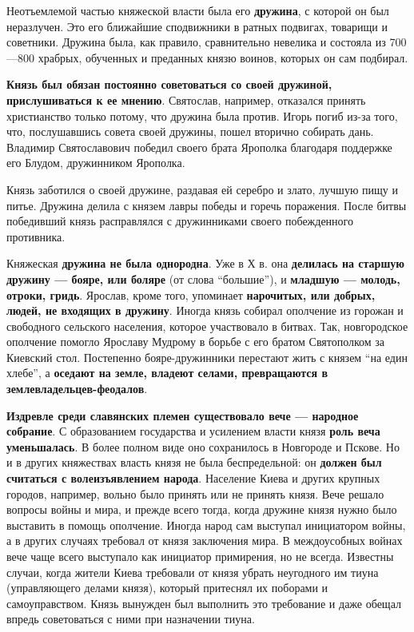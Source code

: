 \documentclass{article}
\begin{document}
\hfill

Неотъемлемой частью княжеской власти была его \textbf{дружина}, с которой он был неразлучен. Это его ближайшие сподвижники в ратных подвигах, товарищи и советники. Дружина была, как правило, сравнительно невелика и состояла из 700—800 храбрых, обученных и преданных князю воинов, которых он сам подбирал.

\textbf{Князь был обязан постоянно советоваться со своей дружиной, прислушиваться к ее мнению}. Святослав, например, отказался принять христианство только потому, что дружина была против. Игорь погиб из-за того, что, послушавшись совета своей дружины, пошел вторично собирать дань. Владимир Святославович победил своего брата Ярополка благодаря поддержке его Блудом, дружинником Ярополка.

Князь заботился о своей дружине, раздавая ей серебро и злато, лучшую пищу и питье. Дружина делила с князем лавры победы и горечь поражения. После битвы победивший князь расправлялся с дружинниками своего побежденного противника.

\hfill

Княжеская \textbf{дружина не была однородна}. Уже в Х в. она \textbf{делилась на старшую дружину — бояре, или боляре} (от слова “большие”), и \textbf{младшую — молодь, отроки, гридь}. Ярослав, кроме того, упоминает \textbf{нарочитых, или добрых, людей, не входящих в дружину}. Иногда князь собирал ополчение из горожан и свободного сельского населения, которое участвовало в битвах. Так, новгородское ополчение помогло Ярославу Мудрому в борьбе с его братом Святополком за Киевский стол. Постепенно бояре-дружинники перестают жить с князем “на един хлебе”, а \textbf{оседают на земле, владеют селами, превращаются в землевладельцев-феодалов}.

\hfill

\textbf{Издревле среди славянских племен существовало вече — народное собрание}. С образованием государства и усилением власти князя \textbf{роль веча уменьшалась}. В более полном виде оно сохранилось в Новгороде и Пскове. Но и в других княжествах власть князя не была беспредельной: он \textbf{должен был считаться с волеизъявлением народа}. Население Киева и других крупных городов, например, вольно было принять или не принять князя. Вече решало вопросы войны и мира, и прежде всего тогда, когда дружине князя нужно было выставить в помощь ополчение. Иногда народ сам выступал инициатором войны, а в других случаях требовал от князя заключения мира. В междоусобных войнах вече чаще всего выступало как инициатор примирения, но не всегда. Известны случаи, когда жители Киева требовали от князя убрать неугодного им тиуна (управляющего делами князя), который притеснял их поборами и самоуправством. Князь вынужден был выполнить это требование и даже обещал впредь советоваться с ними при назначении тиуна.
\end{document}
